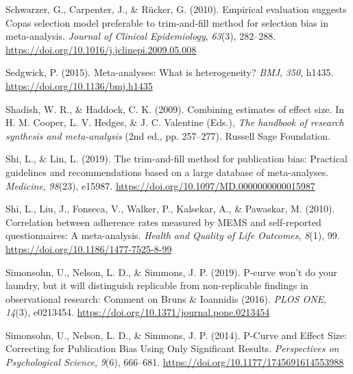 \documentclass[
  bookmarksnumbered]{article}
\newlength{\cslhangindent}
\newlength{\cslentryspacingunit} %
\newenvironment{CSLReferences}[2] %
 {%
  \setlength{\parindent}{0pt}
  \ifodd #1
  \let\oldpar\par
  \def\par{\hangindent=\cslhangindent\oldpar}
  \fi
  \setlength{\parskip}{#2\cslentryspacingunit}
 }%
 {}
\begin{document}
\begin{CSLReferences}{1}{0}
\leavevmode{}%
Schwarzer, G., Carpenter, J., \& Rücker, G. (2010). Empirical evaluation suggests {Copas} selection model preferable to trim-and-fill method for selection bias in meta-analysis. \emph{Journal of Clinical Epidemiology}, \emph{63}(3), 282--288. \url{https://doi.org/10.1016/j.jclinepi.2009.05.008}

\leavevmode{}%
Sedgwick, P. (2015). Meta-analyses: What is heterogeneity? \emph{BMJ}, \emph{350}, h1435. \url{https://doi.org/10.1136/bmj.h1435}

\leavevmode{}%
Shadish, W. R., \& Haddock, C. K. (2009). Combining estimates of effect size. In H. M. Cooper, L. V. Hedges, \& J. C. Valentine (Eds.), \emph{The handbook of research synthesis and meta-analysis} (2nd ed., pp. 257--277). {Russell Sage Foundation}.

\leavevmode{}%
Shi, L., \& Lin, L. (2019). The trim-and-fill method for publication bias: Practical guidelines and recommendations based on a large database of meta-analyses. \emph{Medicine}, \emph{98}(23), e15987. \url{https://doi.org/10.1097/MD.0000000000015987}

\leavevmode{}%
Shi, L., Liu, J., Fonseca, V., Walker, P., Kalsekar, A., \& Pawaskar, M. (2010). Correlation between adherence rates measured by {MEMS} and self-reported questionnaires: A meta-analysis. \emph{Health and Quality of Life Outcomes}, \emph{8}(1), 99. \url{https://doi.org/10.1186/1477-7525-8-99}

\leavevmode{}%
Simonsohn, U., Nelson, L. D., \& Simmons, J. P. (2019). P-curve won't do your laundry, but it will distinguish replicable from non-replicable findings in observational research: {Comment} on {Bruns} \& {Ioannidis} (2016). \emph{PLOS ONE}, \emph{14}(3), e0213454. \url{https://doi.org/10.1371/journal.pone.0213454}

\leavevmode{}%
Simonsohn, U., Nelson, L. D., \& Simmons, J. P. (2014). P-{Curve} and {Effect Size}: {Correcting} for {Publication Bias Using Only Significant Results}. \emph{Perspectives on Psychological Science}, \emph{9}(6), 666--681. \url{https://doi.org/10.1177/1745691614553988}


\end{CSLReferences}
\end{document}
